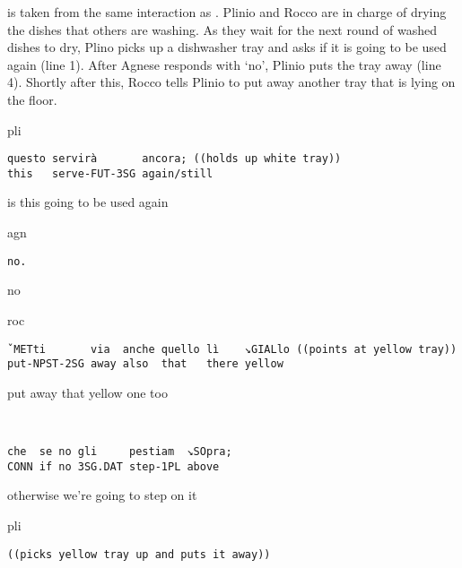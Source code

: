 \documentclass[output=paper,modfonts]{langscibook}
\begin{document}
 is taken from the same interaction as . Plinio and Rocco are in charge of drying the dishes that others are washing. As they wait for the next round of washed dishes to dry, Plino picks up a dishwasher tray and asks if it is going to be used again (line 1). After Agnese responds with ‘no’, Plinio puts the tray away (line 4). Shortly after this, Rocco tells Plinio to put away another tray that is lying on the floor.

\vspace{2mm}
%
\begin{transbox}{1}{pli}
\begin{verbatim}
questo servirà       ancora; ((holds up white tray)) 
this   serve-FUT-3SG again/still
\end{verbatim}
is this going to be used again
\end{transbox}\vspace{1mm}
%
\vspace{-1mm}
%
\begin{transbox}{3}{agn}
\begin{verbatim}
no.
\end{verbatim}
no
\end{transbox}\vspace{2mm}
%
%
%
\begin{mdframednoverticalspace}[style=firstfoc]
\begin{transbox}{6}{roc}
\begin{verbatim}
ˇMETti       via  anche quello lì    ↘GIALlo ((points at yellow tray))
put-NPST-2SG away also  that   there yellow
\end{verbatim}
put away that yellow one too
\end{transbox}\vspace{0.75mm}
\end{mdframednoverticalspace}
%
\begin{transbox}{7}{~}
\begin{verbatim}
che  se no gli     pestiam  ↘SOpra;
CONN if no 3SG.DAT step-1PL above
\end{verbatim}
otherwise we're going to step on it
\end{transbox}
%
\begin{mdframednoverticalspace}[style=secondfoc]
\begin{transbox}{8}{pli}
\begin{verbatim}
((picks yellow tray up and puts it away))
\end{verbatim}
\end{transbox}
\end{mdframednoverticalspace}
\end{document}
